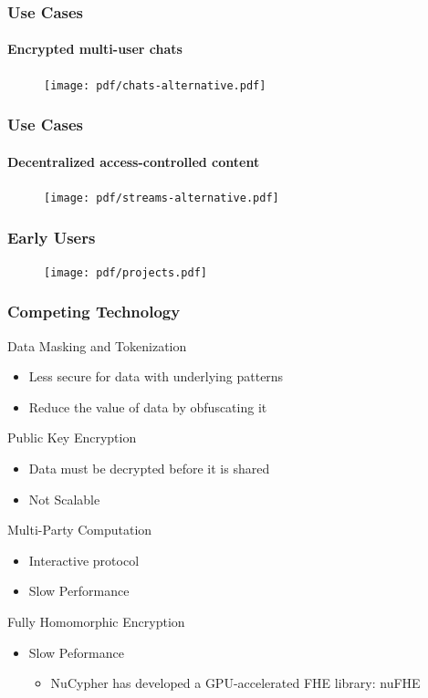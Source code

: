 \documentclass[xetex,mathsans,sans,aspectratio=169]{beamer}
\begin{document}
    \begin{frame}
        \frametitle{Use Cases}
        \framesubtitle{Encrypted multi-user chats}
        \begin{figure}
            \centering
            \texttt{[image: pdf/chats-alternative.pdf]}
        \end{figure}
    \end{frame}

    \begin{frame}
        \frametitle{Use Cases}
        \framesubtitle{Decentralized access-controlled content}
        \begin{figure}
            \centering
            \texttt{[image: pdf/streams-alternative.pdf]}
        \end{figure}
    \end{frame}

    \begin{frame}
      \frametitle{Early Users}
      \begin{figure}
           \texttt{[image: pdf/projects.pdf]}
      \end{figure}
    \end{frame}

    \begin{frame}
      \frametitle{Competing Technology}
       Data Masking and Tokenization
       \begin{itemize}
           \item Less secure for data with underlying patterns
           \item Reduce the value of data by obfuscating it
       \end{itemize}

       Public Key Encryption
       \begin{itemize}
           \item Data must be decrypted before it is shared
           \item Not Scalable
       \end{itemize}

       Multi-Party Computation
       \begin{itemize}
           \item Interactive protocol
           \item Slow Performance
       \end{itemize}

       Fully Homomorphic Encryption
       \begin{itemize}
           \item Slow Peformance
           \begin{itemize}
               \item NuCypher has developed a GPU-accelerated FHE library: nuFHE
           \end{itemize}
       \end{itemize}
     \end{frame}
\end{document}
